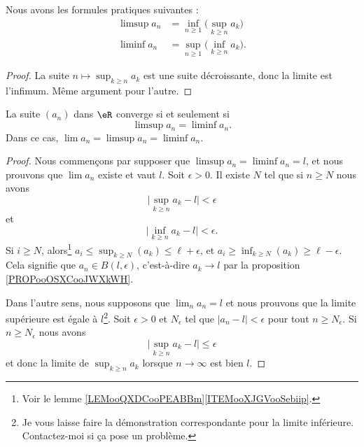 \begin{lemma}     \label{ooAQTEooYDBovS}
	Nous avons les formules pratiques suivantes :
	\begin{subequations}
		\begin{align}
			\limsup a_n & =\inf_{n\geq 1}\big( \sup_{k\geq n}a_k \big)  \\
			\liminf a_n & =\sup_{n\geq 1}\big( \inf_{k\geq n}a_k \big).
		\end{align}
	\end{subequations}
\end{lemma}

\begin{proof}
	La suite \( n\mapsto \sup_{k\geq n}a_k\) est une suite décroissante, donc la limite est l'infimum. Même argument pour l'autre.
\end{proof}

\begin{lemma}       \label{ooIQIKooXWwAmM}
	La suite \( (a_n)\) dans \( \eR\) converge si et seulement si
	\begin{equation}
		\limsup a_n=\liminf a_n.
	\end{equation}
	Dans ce cas, \( \lim a_n=\limsup a_n=\liminf a_n\).
\end{lemma}

\begin{proof}
	Nous commençons par supposer que \( \limsup a_n=\liminf a_n=l\), et nous prouvons que \( \lim a_n\) existe et vaut \( l\). Soit \( \epsilon>0\). Il existe \( N\) tel que si \( n\geq N\) nous avons
	\begin{equation}
		\big| \sup_{k\geq n}a_k-l \big|<\epsilon
	\end{equation}
	et
	\begin{equation}
		\big| \inf_{k\geq n}a_k-l \big|<\epsilon.
	\end{equation}
	Si \( i\geq N\), alors\footnote{Voir le lemme \ref{LEMooQXDCooPEABBm}\ref{ITEMooXJGVooSebiip}.} \( a_i\leq \sup_{k\geq N}(a_k)\leq \ell+\epsilon\), et \( a_i\geq\inf_{k\geq N}(a_k)\geq \ell-\epsilon\). Cela signifie que \( a_n\in B(l,\epsilon)\), c'est-à-dire \( a_k\to l\) par la proposition \ref{PROPooOSXCooJWXkWH}.

	Dans l'autre sens, nous supposons que \( \lim_n a_n=l\) et nous prouvons que la limite supérieure est égale à \( l\)\footnote{Je vous laisse faire la démonstration correspondante pour la limite inférieure. Contactez-moi si ça pose un problème.}. Soit \( \epsilon>0\) et \( N_{\epsilon}\) tel que \( | a_n-l |<\epsilon\) pour tout \( n\geq N_{\epsilon}\). Si \( n\geq N_{\epsilon}\) nous avons
	\begin{equation}
		\big| \sup_{k\geq n}a_k-l \big|\leq \epsilon
	\end{equation}
	et donc la limite de \( \sup_{k\geq n}a_k\) lorsque \( n\to \infty\) est bien \(l\).
\end{proof}

